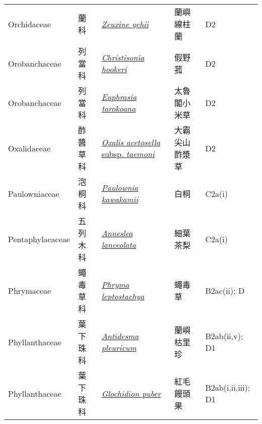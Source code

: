 {\begin{longtable}{L{2.5cm}L{2cm}L{5cm}L{2.5cm}L{3cm}}
    Orchidaceae & 蘭科 & \href{http://www.theplantlist.org/tpl1.1/search?q=Zeuxine+yehii}{\textit{Zeuxine yehii} } & 蘭嶼線柱蘭 & D2    \\
    Orobanchaceae & 列當科 & \href{http://www.theplantlist.org/tpl1.1/search?q=Christisonia+hookeri}{\textit{Christisonia hookeri} } & 假野菰 & D2    \\
    Orobanchaceae & 列當科 & \href{http://www.theplantlist.org/tpl1.1/search?q=Euphrasia+tarokoana}{\textit{Euphrasia tarokoana} } & 太魯閣小米草 & D2    \\
    Oxalidaceae & 酢醬草科 & \href{http://www.theplantlist.org/tpl1.1/search?q=Oxalis+acetosella+subsp.+taemoni}{\textit{Oxalis acetosella} subsp. \textit{taemoni} } & 大霸尖山酢漿草 & D2    \\
    Paulowniaceae & 泡桐科 & \href{http://www.theplantlist.org/tpl1.1/search?q=Paulownia+kawakamii}{\textit{Paulownia kawakamii} } & 白桐 & C2a(i)    \\
    Pentaphylacaceae & 五列木科 & \href{http://www.theplantlist.org/tpl1.1/search?q=Anneslea+lanceolata}{\textit{Anneslea lanceolata} } & 細葉茶梨 & C2a(i)    \\
    Phrymaceae & 蠅毒草科 & \href{http://www.theplantlist.org/tpl1.1/search?q=Phryma+leptostachya}{\textit{Phryma leptostachya} } & 蠅毒草 & B2ac(ii); D    \\
    Phyllanthaceae & 葉下珠科 & \href{http://www.theplantlist.org/tpl1.1/search?q=Antidesma+pleuricum}{\textit{Antidesma pleuricum} } & 蘭嶼枯里珍 & B2ab(ii,v); D1    \\
    Phyllanthaceae & 葉下珠科 & \href{http://www.theplantlist.org/tpl1.1/search?q=Glochidion+puber}{\textit{Glochidion puber} } & 紅毛饅頭果 & B2ab(i,ii,iii); D1    \\

\end{longtable}}
